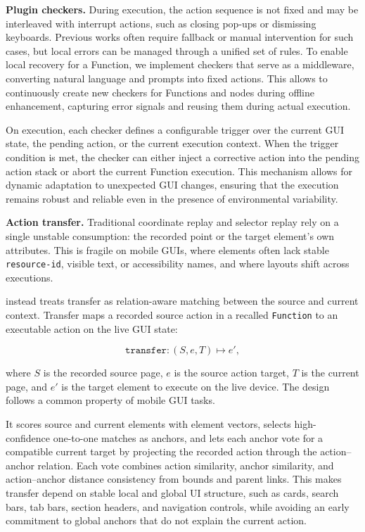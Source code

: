 \textbf{Plugin checkers.} During execution, the action sequence is not fixed and may be interleaved with interrupt actions, such as closing pop-ups or dismissing keyboards. Previous works often require fallback or manual intervention for such cases, but local errors can be managed through a unified set of rules. To enable local recovery for a Function, we implement checkers that serve as a middleware, converting natural language and prompts into fixed actions. This allows \sysname to continuously create new checkers for Functions and nodes during offline enhancement, capturing error signals and reusing them during actual execution.

On execution, each checker defines a configurable trigger over the current GUI state, the pending action, or the current execution context. 
When the trigger condition is met, the checker can either inject a corrective action into the pending action stack or abort the current Function execution. This mechanism allows for dynamic adaptation to unexpected GUI changes, ensuring that the execution remains robust and reliable even in the presence of environmental variability.

\textbf{Action transfer.} Traditional coordinate replay and selector replay rely on a single unstable consumption: the recorded point or the target element's own attributes. This is fragile on mobile GUIs, where elements often lack stable \texttt{resource-id}, visible text, or accessibility names, and where layouts shift across executions.


\sysname instead treats transfer as relation-aware matching between the
source and current context. Transfer maps a recorded source action in a recalled \texttt{Function} to an executable action on the live GUI state:

\[
\texttt{transfer}:(S,e,T)\mapsto e',
\]

where $S$ is the recorded source page, $e$ is the source action target, $T$ is the current page, and $e'$ is the target element to execute on the live device.
The design follows a common property of mobile GUI tasks.

It scores source and current elements with
element vectors, selects high-confidence one-to-one matches as
anchors, and lets each anchor vote for a compatible current target by projecting
the recorded action through the action--anchor relation.  Each vote combines
action similarity, anchor similarity, and action--anchor distance consistency
from bounds and parent links.  This makes transfer depend on stable local and
global UI structure, such as cards, search bars, tab bars, section headers, and
navigation controls, while avoiding an early commitment to global anchors that
do not explain the current action.






